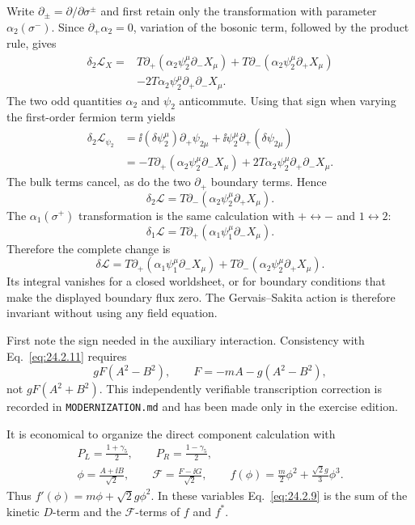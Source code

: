 \begin{enumerate}
Write \(\partial_\pm=\partial/\partial\sigma^\pm\) and first retain only the
transformation with parameter \(\alpha_2(\sigma^-)\).  Since
\(\partial_+\alpha_2=0\), variation of the bosonic term, followed by the
product rule, gives
\[
\begin{aligned}
 \delta_2\mathcal L_X
 ={}&T\partial_+\!\left(
   \alpha_2\psi_2^\mu\partial_-X_\mu\right)
 +T\partial_-\!\left(
   \alpha_2\psi_2^\mu\partial_+X_\mu\right)\\
 &-2T\alpha_2\psi_2^\mu\partial_+\partial_-X_\mu .
\end{aligned}
\]
The two odd quantities \(\alpha_2\) and \(\psi_2\) anticommute.  Using that
sign when varying the first-order fermion term yields
\[
\begin{aligned}
 \delta_2\mathcal L_{\psi_2}
 &=\ii(\delta\psi_2^\mu)\partial_+\psi_{2\mu}
   +\ii\psi_2^\mu\partial_+(\delta\psi_{2\mu})\\
 &=-T\partial_+\!\left(
   \alpha_2\psi_2^\mu\partial_-X_\mu\right)
   +2T\alpha_2\psi_2^\mu\partial_+\partial_-X_\mu .
\end{aligned}
\]
The bulk terms cancel, as do the two \(\partial_+\) boundary terms.  Hence
\[
 \delta_2\mathcal L
 =T\partial_-\!\left(
   \alpha_2\psi_2^\mu\partial_+X_\mu\right).
\]
The \(\alpha_1(\sigma^+)\) transformation is the same calculation with
\(+\leftrightarrow-\) and \(1\leftrightarrow2\):
\[
 \delta_1\mathcal L
 =T\partial_+\!\left(
   \alpha_1\psi_1^\mu\partial_-X_\mu\right).
\]
Therefore the complete change is
\[
 \delta\mathcal L
 =T\partial_+\!\left(\alpha_1\psi_1^\mu\partial_-X_\mu\right)
  +T\partial_-\!\left(\alpha_2\psi_2^\mu\partial_+X_\mu\right).
\]
Its integral vanishes for a closed worldsheet, or for boundary conditions
that make the displayed boundary flux zero.  The Gervais--Sakita action is
therefore invariant without using any field equation.

First note the sign needed in the auxiliary interaction.  Consistency with
Eq.~\eqref{eq:24.2.11} requires
\[
 gF(A^2-B^2),\qquad
 F=-mA-g(A^2-B^2),
\]
not \(gF(A^2+B^2)\).  This independently verifiable transcription correction
is recorded in \texttt{MODERNIZATION.md} and has been made only in the
exercise edition.

It is economical to organize the direct component calculation with
\[
\begin{gathered}
 P_L=\frac{1+\gamma_5}{2},\qquad
 P_R=\frac{1-\gamma_5}{2},\\
 \phi=\frac{A+\ii B}{\sqrt2},\qquad
 \mathcal F=\frac{F-\ii G}{\sqrt2},\qquad
 f(\phi)=\frac m2\phi^2+\frac{\sqrt2g}{3}\phi^3 .
\end{gathered}
\]
Thus \(f'(\phi)=m\phi+\sqrt2g\phi^2\).  In these variables
Eq.~\eqref{eq:24.2.9} is the sum of the kinetic \(D\)-term and the
\(\mathcal F\)-terms of \(f\) and \(f^*\).


\end{enumerate}
